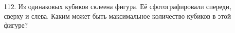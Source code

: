 112. Из одинаковых кубиков склеена фигура. Её сфотографировали спереди, сверху и слева. Каким может быть максимальное количество кубиков в этой фигуре?
\begin{center}
\begin{figure}[ht!]
\end{figure}
\end{center}
